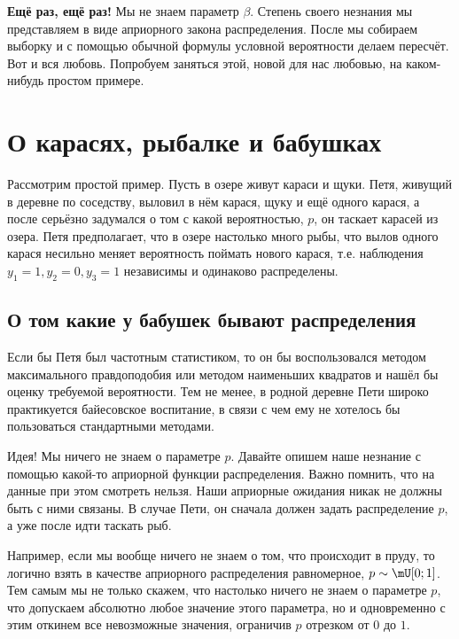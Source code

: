 \textbf{Ещё раз, ещё раз!} Мы не знаем параметр $\beta$. Степень своего незнания мы представляем в виде априорного закона распределения. После мы собираем выборку и с помощью обычной формулы условной вероятности делаем пересчёт. Вот и вся любовь. Попробуем заняться этой, новой для нас любовью, на каком-нибудь простом примере.

\section{О карасях, рыбалке и бабушках}

Рассмотрим простой пример. Пусть в озере живут караси и щуки. Петя, живущий в деревне по соседству, выловил в нём карася, щуку и ещё одного карася, а после серьёзно задумался о том с какой вероятностью, $p$, он таскает карасей из озера. Петя предполагает, что в озере настолько много рыбы, что вылов одного карася несильно меняет вероятность поймать нового карася, т.е. наблюдения $y_1 = 1, y_2 = 0, y_3 = 1$ независимы и одинаково распределены.

\subsection*{О том какие у бабушек бывают распределения}

Если бы Петя был частотным статистиком, то он бы воспользовался методом максимального правдоподобия или методом наименьших квадратов и нашёл бы оценку требуемой вероятности. Тем не менее, в родной деревне Пети широко практикуется байесовское воспитание, в связи с чем ему не хотелось бы пользоваться стандартными методами.

Идея! Мы ничего не знаем о параметре $p$. Давайте опишем наше незнание с помощью какой-то априорной функции распределения. Важно  помнить, что на данные при этом смотреть нельзя. Наши априорные ожидания никак не должны быть с ними связаны. В случае Пети, он сначала должен задать распределение $p$, а уже после идти таскать рыб. 

Например, если мы вообще ничего не знаем о том, что происходит в пруду, то логично взять в качестве априорного распределения равномерное, $p \sim \mU[0;1]$. Тем самым мы не только скажем, что настолько ничего не знаем о параметре $p$, что допускаем абсолютно любое значение этого параметра, но и одновременно с этим откинем все невозможные значения, ограничив $p$ отрезком от $0$ до $1$.

